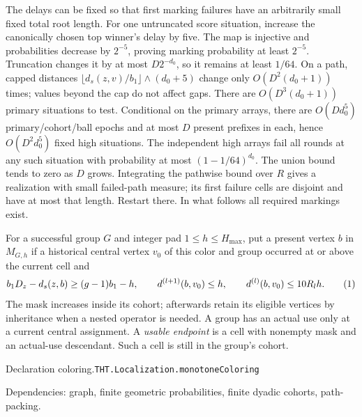 \documentclass[11pt]{article}
\theoremstyle{definition}
\newcommand{\eqtag}[1]{\refstepcounter{equation}\tag{\theequation}\label{#1}}
\numberwithin{equation}{section}
\newcommand{\bp}[3]{\par\smallskip\begingroup\footnotesize
\noindent\hypertarget{bp:#1}{\textsf{Declaration #1.}}\quad\nolinkurl{#2}\par
\noindent\textsf{Dependencies:} #3.\par\endgroup\smallskip}
\begin{document}
The delays can be fixed so that first marking failures have an arbitrarily small fixed total root length. For one untruncated score situation, increase the canonically chosen top winner's delay by five. The map is injective and probabilities decrease by $2^{-5}$, proving marking probability at least $2^{-5}$. Truncation changes it by at most $D2^{-d_0}$, so it remains at least $1/64$. On a path, capped distances $\lfloor d_s(z,v)/b_1\rfloor\wedge(d_0+5)$ change only $O(D^2(d_0+1))$ times; values beyond the cap do not affect gaps. There are $O(D^3(d_0+1))$ primary situations to test. Conditional on the primary arrays, there are $O(Dd_0^5)$ primary/cohort/ball epochs and at most $D$ present prefixes in each, hence $O(D^2d_0^5)$ fixed high situations. The independent high arrays fail all rounds at any such situation with probability at most $(1-1/64)^{d_0}$. The union bound tends to zero as $D$ grows. Integrating the pathwise bound over $R$ gives a realization with small failed-path measure; its first failure cells are disjoint and have at most that length. Restart there. In what follows all required markings exist.

For a successful group $G$ and integer pad $1\le h\le H_{\max}$, put a present vertex $b$ in $M_{G,h}$ if a historical central vertex $v_0$ of this color and group occurred at or above the current cell and
\[
 b_1D_z-d_s(z,b)\ge(g-1)b_1-h,\qquad
 d^{(l+1)}(b,v_0)\le h,\qquad d^{(l)}(b,v_0)\le10R_lh.
 \eqtag{eq:ball-mask}
\]
The mask increases inside its cohort; afterwards retain its eligible vertices by inheritance when a nested operator is needed. A group has an actual use only at a current central assignment. A \emph{usable endpoint} is a cell with nonempty mask and an actual-use descendant. Such a cell is still in the group's cohort.

\bp{coloring}{THT.Localization.monotoneColoring}{graph, finite geometric probabilities, finite dyadic cohorts, path-packing}
\end{document}
